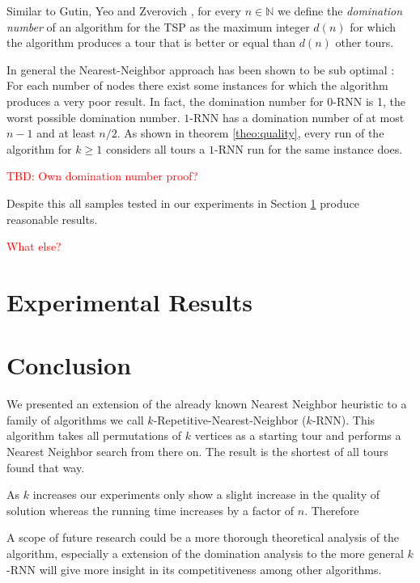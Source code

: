 \documentclass[11pt]{article}
\newcommand{\red}{\textcolor{red}}
\begin{document}
	Similar to Gutin, Yeo and Zverovich \cite{GUTIN2002}, for every $n \in \mathbb{N}$ we define the \textit{domination number} of an algorithm for the TSP as the maximum integer $d(n)$ for which the algorithm produces a tour that is better or equal than $d(n)$ other tours.
	 
	
	In general the Nearest-Neighbor approach has been shown to be sub optimal \cite{GUTIN2002}: 
	For each number of nodes there exist some instances for which the algorithm produces a very poor result.
	In fact, the domination number for $0$-RNN is 1, the worst possible domination number.
	$1$-RNN has a domination number of at most $n - 1$ and at least $n / 2$.
	As shown in theorem \ref{theo:quality}, every run of the algorithm for $k \geq 1$ considers all tours a $1$-RNN run for the same instance does.
	
	
	\red{TBD: Own domination number proof?}
	
	Despite this all samples tested in our experiments in Section \ref{sec:experimental} produce reasonable results.
	
	\red{What else?}
	\section{Experimental Results}
	\label{sec:experimental}
	
	

	
	\section{Conclusion}
	\label{sec:conclusion}
	
	We presented an extension of the already known Nearest Neighbor heuristic to a family of algorithms we call $k$-Repetitive-Nearest-Neighbor ($k$-RNN). 
	This algorithm takes all permutations of $k$ vertices as a starting tour and performs a Nearest Neighbor search from there on. 
	The result is the shortest of all tours found that way.
	
	As $k$ increases our experiments only show a slight increase in the quality of solution whereas the running time increases by a factor of $n$.
	Therefore
	
	A scope of future research could be a more thorough theoretical analysis of the algorithm, especially a extension of the domination analysis to the more general $k$-RNN will give more insight in its competitiveness among other algorithms.

	
	
	
	
\end{document}
